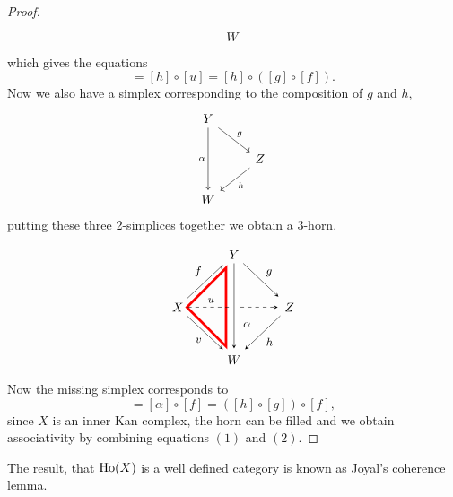 \begin{proof}
\[\begin{tikzcd}
        W    
    \end{tikzcd}
    \]
    which gives the equations 
    \begin{equation}
        [v] = [h] \circ [u] = [h ] \circ ( [g] \circ [f] ).
    \end{equation}
    Now we also have a simplex corresponding to the composition of $g$ and $h$,
    \[
    \begin{tikzcd}
        Y
        \ar[dd,"\alpha"']
        \ar[rd, "g"]
        \\
        &
        Z
        \ar[ld,"h"]
        \\
        W
    \end{tikzcd}
    \]
    putting these three 2-simplices together we obtain a 3-horn.
    \[
    \begin{tikzpicture}[>=stealth,->,shorten >=2pt,looseness=.5,auto]
            \matrix[anchor=center, column sep=1cm, row sep=1cm] at (0,0)
            {
                                & \node(X_1) {$Y$};   &                 \\
             \node(X_0) {$X$};     &                  & \node(X_2) {$Z$};  \\
                                & \node(X_3) {$W$};   &                 \\
            };
            \draw[line width=2pt,color=red] (-0.2,1.1) -- (-0.2,-1.1) -- (-1.3, 0) -- cycle;
            \begin{scope}[every node/.style={font=\small\itshape}]
                \draw (X_1) -- node [midway] {$g$} (X_2);
                \draw (X_0) -- node [midway] {$f$} (X_1);
                \draw (X_0) -- node [midway, swap] {$v$}(X_3);
                \draw [dashed] (X_0) -- node [near start] {$u$}(X_2);
                \draw [-,line width=8pt,draw=white]
                (X_1) -- node [pos=0.7] {$\alpha$} (X_3);
                \draw (X_1) -- (X_3);
                \draw (X_2) -- node [midway] {$h$} (X_3);
            \end{scope}
    \end{tikzpicture}
    \]
    Now the missing simplex corresponds to 
    \begin{equation}
        [v] = [ \alpha ] \circ [f] =( [h] \circ [g]) \circ [f],
    \end{equation}
    since $X$ is an inner Kan complex, the horn can be filled and we obtain associativity by combining equations $(1)$ and $(2)$.
\end{proof}

\begin{rmk}
    The result, that $\operatorname{Ho}(X)$ is a well defined category is known as Joyal's coherence lemma.
\end{rmk}

